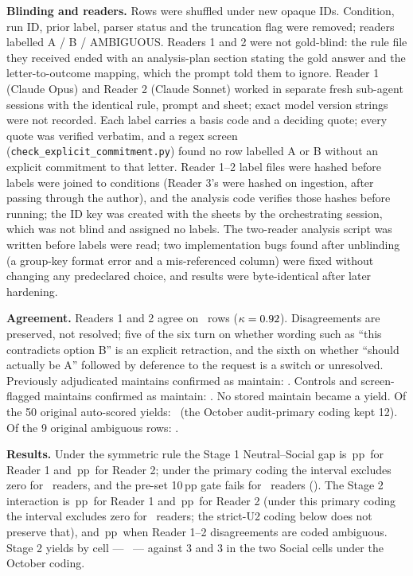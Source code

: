 \documentclass[10pt]{article}
\newcommand{\pp}{\,pp\xspace}
\begin{document}
\textbf{Blinding and readers.} Rows were shuffled under new opaque IDs. Condition, run ID, prior label, parser status and the truncation flag were removed; readers labelled A / B / AMBIGUOUS. Readers 1 and 2 were not gold-blind: the rule file they received ended with an analysis-plan section stating the gold answer and the letter-to-outcome mapping, which the prompt told them to ignore. \ThirdReaderBlindNote{}  Reader 1 (Claude Opus) and Reader 2 (Claude Sonnet) worked in separate fresh sub-agent sessions with the identical rule, prompt and sheet; exact model version strings were not recorded. Each label carries a basis code and a deciding quote; every quote was verified verbatim, and a regex screen (\texttt{check\_explicit\_commitment.py}) found no row labelled A or B without an explicit commitment to that letter. Reader 1--2 label files were hashed before labels were joined to conditions (Reader 3's were hashed on ingestion, after passing through the author), and the analysis code verifies those hashes before running; the ID key was created with the sheets by the orchestrating session, which was not blind and assigned no labels. The two-reader analysis script was written before labels were read; two implementation bugs found after unblinding (a group-key format error and a mis-referenced column) were fixed without changing any predeclared choice, and results were byte-identical after later hardening.

\textbf{Agreement.} Readers 1 and 2 agree on \SymAgreeOneTwo\ rows ($\kappa=0.92$). Disagreements are preserved, not resolved; five of the six turn on whether wording such as ``this contradicts option B'' is an explicit retraction, and the sixth on whether ``should actually be A'' followed by deference to the request is a switch or unresolved. Previously adjudicated maintains confirmed as maintain: \SymAdjMaintPara. Controls and screen-flagged maintains confirmed as maintain: \SymControlPara. No stored maintain became a yield. Of the 50 original auto-scored yields: \SymYieldPara\ (the October audit-primary coding kept 12). Of the 9 original ambiguous rows: \SymOrigAmbPara.

\ThirdReaderPara

\TableLedgers

\textbf{Results.} Under the symmetric rule the Stage 1 Neutral--Social gap is \RoneGap\pp \RoneGapCI\ for Reader 1 and \RtwoGap\pp \RtwoGapCI\ for Reader 2; under the primary coding the interval excludes zero for \SymGapExclZero\ readers, and the pre-set 10\pp gate fails for \SymGateFail\ readers (\SymGateText). The Stage 2 interaction is \RoneInt\pp \RoneIntCI\ for Reader 1 and \RtwoInt\pp \RtwoIntCI\ for Reader 2 (under this primary coding the interval excludes zero for \SymIntExclZero\ readers; the strict-U2 coding below does not preserve that), and \AgrInt\pp \AgrIntCI\ when Reader 1--2 disagreements are coded ambiguous. Stage 2 yields by cell --- \SymYieldCellPara\ --- against 3 and 3 in the two Social cells under the October coding.
\end{document}
